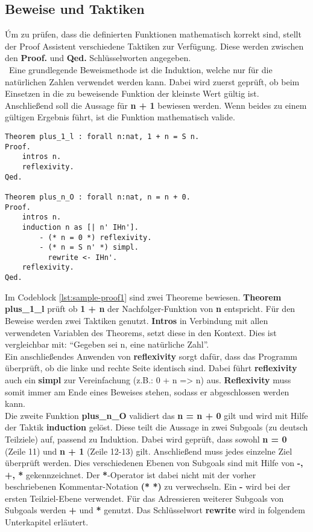 \subsection{Beweise und Taktiken}
Úm zu prüfen, dass die definierten Funktionen mathematisch korrekt sind, stellt der Proof Assistent verschiedene Taktiken zur Verfügung. Diese werden zwischen den \textbf{Proof.} und \textbf{Qed.} Schlüsselworten angegeben.\\\
Eine grundlegende Beweismethode ist die Induktion, welche nur für die natürlichen Zahlen verwendet werden kann. Dabei wird zuerst geprüft, ob beim Einsetzen in die zu beweisende Funktion der kleinste Wert gültig ist. Anschließend soll die Aussage für \textbf{n + 1} bewiesen werden. Wenn beides zu einem gültigen Ergebnis führt, ist die Funktion mathematisch valide.
\begin{lstlisting}[language=coq,firstnumber=1,caption=Coq Beispielbeweis,label=lst:sample-proof1]
Theorem plus_1_l : forall n:nat, 1 + n = S n.
Proof.
	intros n. 
	reflexivity. 
Qed.

Theorem plus_n_O : forall n:nat, n = n + 0.
Proof.
	intros n. 
	induction n as [| n' IHn'].
		- (* n = 0 *) reflexivity.
		- (* n = S n' *) simpl.
		  rewrite <- IHn'.
	reflexivity.
Qed.
\end{lstlisting}
Im Codeblock \ref{lst:sample-proof1} sind zwei Theoreme bewiesen. \textbf{Theorem plus\_1\_l} prüft ob \textbf{1 + n} der Nachfolger-Funktion von \textbf{n} entspricht.
Für den Beweise werden zwei Taktiken genutzt. \textbf{Intros} in Verbindung mit allen verwendeten Variablen des Theorems, setzt diese in den Kontext. Dies ist vergleichbar mit: "`Gegeben sei n, eine natürliche Zahl"'.\\
Ein anschließendes Anwenden von \textbf{reflexivity} sorgt dafür, dass das Programm überprüft, ob die linke und rechte Seite identisch sind. Dabei führt \textbf{reflexivity} auch ein \textbf{simpl} zur Vereinfachung (z.B.: 0 + n => n) aus. \textbf{Reflexivity} muss somit immer am Ende eines Beweises stehen, sodass er abgeschlossen werden kann.\\
Die zweite Funktion \textbf{plus\_n\_O} validiert das \textbf{n = n + 0} gilt und wird mit Hilfe der Taktik \textbf{induction} gelöst. Diese teilt die Aussage in zwei Subgoals (zu deutsch Teilziele) auf, passend zu Induktion. Dabei wird geprüft, dass sowohl \textbf{n = 0} (Zeile 11) und \textbf{n + 1} (Zeile 12-13) gilt.
Anschließend muss jedes einzelne Ziel überprüft werden. Dies verschiedenen Ebenen von Subgoals sind mit Hilfe von \textbf{-, +, *} gekennzeichnet. Der \textbf{*}-Operator ist dabei nicht mit der vorher beschriebenen Kommentar-Notation \textbf{(* *)} zu verwechseln. Ein \textbf{-} wird bei der ersten Teilziel-Ebene verwendet. Für das Adressieren weiterer Subgoals von Subgoals werden \textbf{+} und \textbf{*} genutzt. Das Schlüsselwort \textbf{rewrite} wird in folgendem Unterkapitel erläutert.

